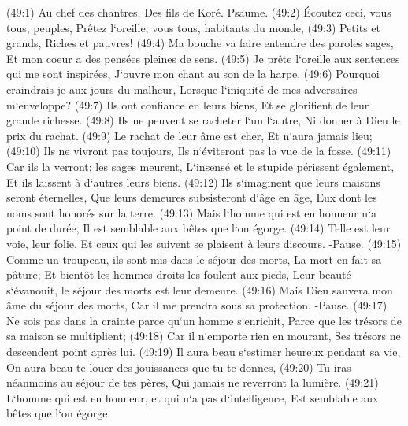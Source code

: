 \verse (49:1) Au chef des chantres. Des fils de Koré. Psaume. (49:2) Écoutez ceci, vous tous, peuples, Prêtez l`oreille, vous tous, habitants du monde, 
\verse (49:3) Petits et grands, Riches et pauvres! 
\verse (49:4) Ma bouche va faire entendre des paroles sages, Et mon coeur a des pensées pleines de sens. 
\verse (49:5) Je prête l`oreille aux sentences qui me sont inspirées, J`ouvre mon chant au son de la harpe. 
\verse (49:6) Pourquoi craindrais-je aux jours du malheur, Lorsque l`iniquité de mes adversaires m`enveloppe? 
\verse (49:7) Ils ont confiance en leurs biens, Et se glorifient de leur grande richesse. 
\verse (49:8) Ils ne peuvent se racheter l`un l`autre, Ni donner à Dieu le prix du rachat. 
\verse (49:9) Le rachat de leur âme est cher, Et n`aura jamais lieu; 
\verse (49:10) Ils ne vivront pas toujours, Ils n`éviteront pas la vue de la fosse. 
\verse (49:11) Car ils la verront: les sages meurent, L`insensé et le stupide périssent également, Et ils laissent à d`autres leurs biens. 
\verse (49:12) Ils s`imaginent que leurs maisons seront éternelles, Que leurs demeures subsisteront d`âge en âge, Eux dont les noms sont honorés sur la terre. 
\verse (49:13) Mais l`homme qui est en honneur n`a point de durée, Il est semblable aux bêtes que l`on égorge. 
\verse (49:14) Telle est leur voie, leur folie, Et ceux qui les suivent se plaisent à leurs discours. -Pause. 
\verse (49:15) Comme un troupeau, ils sont mis dans le séjour des morts, La mort en fait sa pâture; Et bientôt les hommes droits les foulent aux pieds, Leur beauté s`évanouit, le séjour des morts est leur demeure. 
\verse (49:16) Mais Dieu sauvera mon âme du séjour des morts, Car il me prendra sous sa protection. -Pause. 
\verse (49:17) Ne sois pas dans la crainte parce qu`un homme s`enrichit, Parce que les trésors de sa maison se multiplient; 
\verse (49:18) Car il n`emporte rien en mourant, Ses trésors ne descendent point après lui. 
\verse (49:19) Il aura beau s`estimer heureux pendant sa vie, On aura beau te louer des jouissances que tu te donnes, 
\verse (49:20) Tu iras néanmoins au séjour de tes pères, Qui jamais ne reverront la lumière. 
\verse (49:21) L`homme qui est en honneur, et qui n`a pas d`intelligence, Est semblable aux bêtes que l`on égorge. 

\chapter{}


